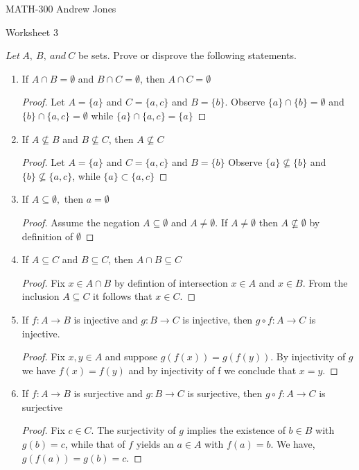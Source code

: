 \documentclass{article}
\begin{document}
  MATH-300 \hfill Andrew Jones
  \begin{center}
  {\huge Worksheet 3}
  \end{center}
  $Let\ A,\ B,\ and\ C$ be sets. Prove or disprove the following statements. \\
  \begin{enumerate}
  \item If $A\cap B = \emptyset$ and $B\cap C = \emptyset$, then $A\cap C = \emptyset$
    \begin{proof}
      Let $A = \{a\}$ and $C = \{a, c\}$ and $B = \{b\}$.
      Observe $\{a\}\cap \{b\} = \emptyset$ and $\{b\}\cap \{a, c\} = \emptyset$ while $\{a\}\cap \{a,c\} = \{a\}$
    \end{proof}
  \item If $A\not\subseteq B$ and $B\not\subseteq C$, then $A\not\subseteq C$ 
    \begin{proof}
      Let $A = \{a\}$ and $C = \{a, c\}$ and $B = \{b\}$ 
      Observe $\{a\}\not\subseteq \{b\}$ and $\{b\}\not\subseteq \{a, c\}$, while $\{a\}\subset \{a, c\}$
    \end{proof}
  \item If $A\subseteq \emptyset,$ then $a= \emptyset$ 
    \begin{proof}
      Assume the negation $A\subseteq \emptyset$ and $A \neq \emptyset$.
      If $A \neq \emptyset$ then $A\not\subseteq \emptyset$ by definition of $\emptyset$ 
    \end{proof}
  \item If $A\subseteq C$ and $B\subseteq C$, then $A\cap B\subseteq C$
    \begin{proof}
     Fix  $x \in A\cap B$ by defintion of intersection $x\in A$ and $x\in B$. From the inclusion $A\subseteq C$ it follows that $x\in C$.
   \end{proof}
  \item If $f : A\to B$ is injective and $g : B\to C$ is injective, then $g \circ f : A\to C$ is injective. 
    \begin{proof}
      Fix $x,y\in A$ and suppose $g(f(x)) = g(f(y))$. By injectivity of $g$ we have $f(x) = f(y)$ and by injectivity of f we conclude that $x = y$.
    \end{proof}
  \item If $f : A\to B$ is surjective and $g : B\to C$ is surjective, then $g \circ f : A\to C$ is surjective 
    \begin{proof}
      Fix $c\in C$. The surjectivity of $g$ implies the existence of $b\in B$ with $g(b) =c$, while that of $f$ yields an $a\in A$ with $f(a) = b$. We have, $g(f(a)) = g(b) = c$. 

\end{proof}
\end{enumerate}
\end{document}
